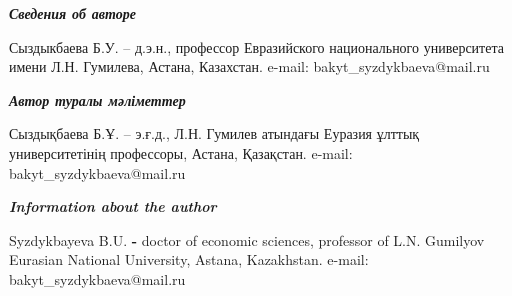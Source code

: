\begin{authorinfo}
\emph{{\bfseries Сведения об авторе}}

Сыздыкбаева Б.У. -- д.э.н., профессор Евразийского национального
университета имени Л.Н. Гумилева, Астана, Казахстан. e-mail:
bakyt\_syzdykbaeva@mail.ru

\emph{{\bfseries Автор туралы мәліметтер}}

Сыздықбаева Б.Ұ. -- э.ғ.д., Л.Н. Гумилев атындағы Еуразия ұлттық
университетінің профессоры, Астана, Қазақстан. e-mail:
bakyt\_syzdykbaeva@mail.ru

\emph{{\bfseries Information about the author}}

Syzdykbayeva B.U. {\bfseries -} doctor of economic sciences, professor of
L.N. Gumilyov Eurasian National University, Astana, Kazakhstan. e-mail:
bakyt\_syzdykbaeva@mail.ru
\end{authorinfo}
